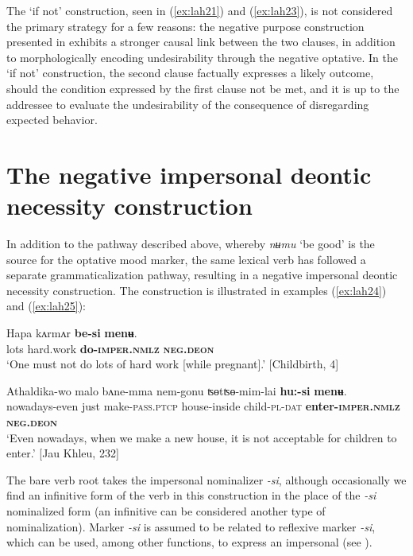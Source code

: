 \documentclass[output=paper,colorlinks,citecolor=brown]{langscibook}
\begin{document}
The `if not' construction, seen in (\ref{ex:lah21}) and (\ref{ex:lah23}), is not considered the primary strategy for a few reasons: the negative purpose construction presented in  exhibits a stronger causal link between the two clauses, in addition to morphologically encoding undesirability through the negative optative. In the `if not' construction, the second clause factually expresses a likely outcome, should the condition expressed by the first clause not be met, and it is up to the addressee to evaluate the undesirability of the consequence of disregarding expected behavior.





\section{The negative impersonal deontic necessity construction}
\label{sec:negimp}

In addition to the pathway described above, whereby \textit{nʉmu} `be good' is the source for the optative mood marker, the same lexical verb has followed a separate grammaticalization pathway, resulting in a negative impersonal deontic necessity construction. The construction is illustrated in examples (\ref{ex:lah24}) and (\ref{ex:lah25}):


\ea \label{ex:lah24}
\gll Hapa kʌrmʌr \textbf{be-si} \textbf{menʉ}. \\
lots hard.work \textbf{do\textsc{-imper.nmlz}} \textbf{\textsc{neg.deon}} \\
\glt `One must not do lots of hard work [while pregnant].' [Childbirth, 4]
\z


\ea \label{ex:lah25}
\gll Athaldika-wo malo bʌne-mma nem-gonu ʦɵtʦɵ-mim-lai \textbf{hu:-si} \textbf{menʉ}. \\
nowadays-even just make-\textsc{pass.ptcp} house-inside child-\textsc{pl-dat} \textbf{enter-\textsc{imper.nmlz}} \textbf{\textsc{neg.deon}} \\
\glt `Even nowadays, when we make a new house, it is not acceptable for children to enter.' [Jau Khleu, 232]
\z

\noindent The bare verb root takes the impersonal nominalizer \textit{-si}, although occasionally we find an infinitive form of the verb in this construction in the place of the \textit{-si} nominalized form (an infinitive can be considered another type of nominalization). Marker \textit{-si} is assumed to be related to reflexive marker \textit{-si}, which can be used, among other functions, to express an impersonal (see \citealt{Lahaussois2016,Lahaussois2023}).
\end{document}
